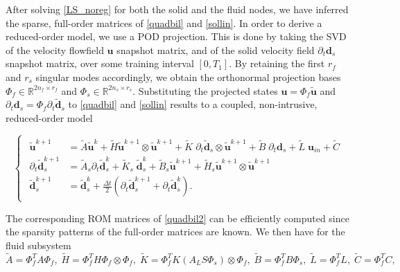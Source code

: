 \documentclass[%
  onecolumn
]{mpi2015-cscpreprint}
\begin{document}
After solving \cref{LS_noreg} for both the solid and the fluid nodes, we have inferred the sparse, full-order matrices of \cref{quadbil} and \cref{sollin}. In order to derive a reduced-order model, we use a POD projection. This is done by taking the SVD of the velocity flowfield $\mathbf{u}$ snapshot matrix, and of the solid velocity field $\partial_{t} \mathbf{d}_s$ snapshot matrix, over some training interval $[0,T_1]$. By retaining the first $r_f$ and $r_s$ singular modes accordingly, we obtain the orthonormal projection bases $\Phi_f \in \mathbb{R}^{2n_f \times r_f}$ and $\Phi_s \in \mathbb{R}^{2n_s \times r_s}$. Substituting the projected states $\mathbf{u}=\Phi_f \tilde{\mathbf{u}}$ and $\partial_{t} \mathbf{d}_s=\Phi_f \partial_{t} \tilde{\mathbf{d}}_s$ to \cref{quadbil} and \cref{sollin} results to a coupled, non-intrusive, reduced-order model

\begin{equation} 
\label{quadbil2}
\left\{\begin{array}{ll}
\begin{aligned}
\tilde{\mathbf{u}}^{k+1} &= \tilde{A} \tilde{\mathbf{u}}^k + \tilde{H} \tilde{\mathbf{u}}^{k+1} \otimes \tilde{\mathbf{u}}^{k+1} + \tilde{K} \; \partial_{t} \tilde{\mathbf{d}}_s \otimes \tilde{\mathbf{u}}^{k+1} 
 + \tilde{B} \; \partial_{t} \mathbf{d}_s + \tilde{L} \; \mathbf{u}_{in} + \tilde{C} \\
\partial_{t} \tilde{\mathbf{d}}_s^{k+1} &=\tilde{A}_s \partial_{t} \tilde{\mathbf{d}}_s^k + \tilde{K}_s \; \tilde{\mathbf{d}}_s^{k}+\tilde{B}_s \tilde{\mathbf{u}}^{k+1}+\tilde{H}_s \tilde{\mathbf{u}}^{k+1} \otimes \tilde{\mathbf{u}}^{k+1} \\
\tilde{\mathbf{d}}_s^{k+1} &=\tilde{\mathbf{d}}_s^{k}+\frac{\Delta t}{2}(\partial_t \tilde{\mathbf{d}}_s^{k+1}+\partial_t \tilde{\mathbf{d}}_s^{k}).
\end{aligned}
\end{array}\right.
\end{equation}

\noindent The corresponding ROM matrices of \cref{quadbil2} can be efficiently computed since the sparsity patterns of the full-order matrices are known. We then have for the fluid subsystem 
\begin{equation}
\label{projF}
\tilde{A}=\Phi_f^T A \Phi_f, \; \tilde{H}=\Phi_f^T H \Phi_f \otimes \Phi_f, \; \tilde{K}=\Phi_f^T K (A_L S \Phi_s) \otimes \Phi_f, \;
\tilde{B}=\Phi_f^T B \Phi_s, \; \tilde{L}=\Phi_f^T L, \; \tilde{C}=\Phi_f^T C,
    \end{equation}
\end{document}
